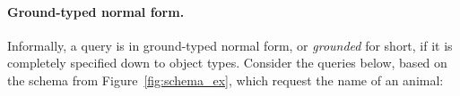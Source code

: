 
\paragraph{Ground-typed normal form.}
Informally, a query is in ground-typed normal form, or {\em grounded} for short, if it is completely specified down to object types. Consider the queries below, based on the schema from Figure~\ref{fig:schema_ex}, which request the name of an animal: 

